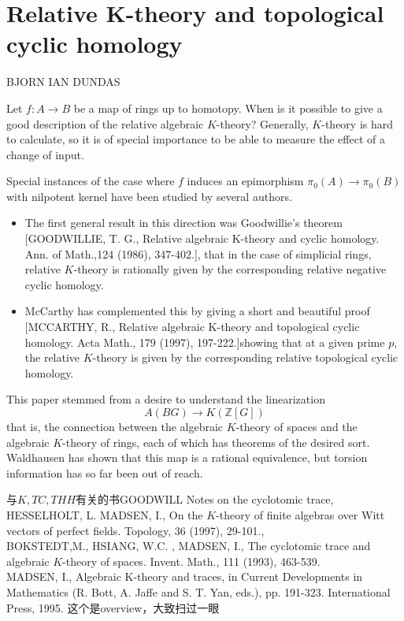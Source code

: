 \section{Relative K-theory and topological cyclic homology} %
\label{sec:relative_k_theory_and_topological_cyclic_homology}
BJORN IAN DUNDAS

Let $f: A\rightarrow B$ be a map of rings up to homotopy. When is it possible to give a good description of the relative algebraic $K$-theory? Generally, $K$-theory is hard to calculate, so it is of special importance to be able to measure the effect of a change of input.

Special instances of the case where $f$ induces an epimorphism $\pi_0(A)\rightarrow \pi_0(B)$ with
nilpotent kernel have been studied by several authors. 
\begin{itemize}
	\item  The first general result in this direction was Goodwillie's theorem [GOODWILLIE, T. G., Relative algebraic K-theory and cyclic homology. Ann. of Math.,124 (1986), 347-402.], that in the case of simplicial rings, relative $K$-theory is rationally given by the corresponding relative negative cyclic homology.
	\item McCarthy has complemented this by giving a short and beautiful proof [MCCARTHY, R., Relative algebraic K-theory and topological cyclic homology. Acta Math., 179 (1997), 197-222.]showing that at a given prime $p$, the relative $K$-theory is given by the corresponding relative topological cyclic homology.
\end{itemize}
This paper stemmed from a desire to understand the linearization 
\[A(BG) \longrightarrow K(\mathbb{Z} [G])\]
 that is, the connection between the algebraic $K$-theory of spaces and the algebraic $K$-theory of rings, each of which has theorems of the desired sort. Waldhausen has shown that this map is a rational equivalence, but torsion information has so far been out of reach.


与$K,TC,THH$有关的书GOODWILL Notes on the cyclotomic trace, \\HESSELHOLT, L.  MADSEN, I., On the $K$-theory of finite algebras over Witt vectors of perfect fields. Topology, 36 (1997), 29-101.,\\
BOKSTEDT,M., HSIANG, W.C. , MADSEN, I., The cyclotomic trace and algebraic $K$-theory of spaces. Invent. Math., 111 (1993), 463-539.\\
MADSEN, I., Algebraic K-theory and traces, in Current Developments in Mathematics (R. Bott, A. Jaffe and S. T. Yan, eds.), pp. 191-323. International Press, 1995. 这个是overview，大致扫过一眼


